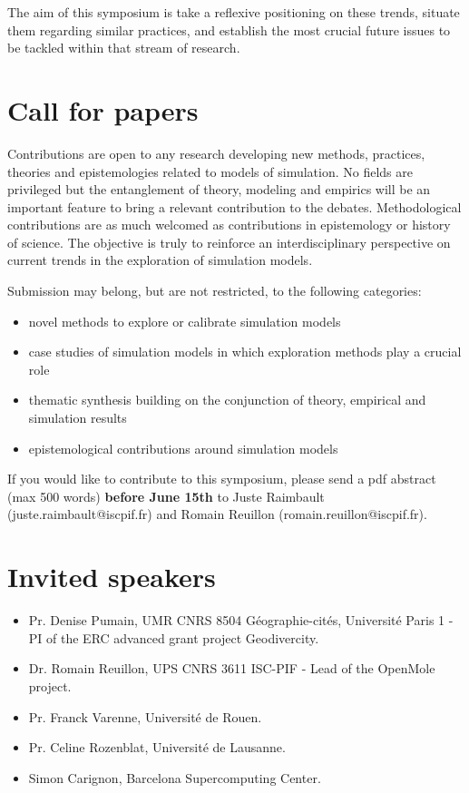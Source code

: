 \documentclass[11pt]{article}
\begin{document}
The aim of this symposium is take a reflexive positioning on these trends, situate them regarding similar practices, and establish the most crucial future issues to be tackled within that stream of research. 

\section*{Call for papers}

Contributions are open to any research developing new methods, practices, theories and epistemologies related to models of simulation. No fields are privileged but the entanglement of theory, modeling and empirics will be an important feature to bring a relevant contribution to the debates. Methodological contributions are as much welcomed as contributions in epistemology or history of science. The objective is truly to reinforce an interdisciplinary perspective on current trends in the exploration of simulation models.

Submission may belong, but are not restricted, to the following categories:
\begin{itemize}
	\item novel methods to explore or calibrate simulation models
	\item case studies of simulation models in which exploration methods play a crucial role
	\item thematic synthesis building on the conjunction of theory, empirical and simulation results
	\item epistemological contributions around simulation models
\end{itemize}
    
    
If you would like to contribute to this symposium, please send a pdf abstract (max 500 words) \textbf{before June 15th} to Juste Raimbault (juste.raimbault@iscpif.fr) and Romain Reuillon (romain.reuillon@iscpif.fr). 
    


\section*{Invited speakers}

\begin{itemize}
    \item Pr. Denise Pumain, UMR CNRS 8504 Géographie-cités, Université Paris 1 - PI of the ERC advanced grant project Geodivercity.
    \item Dr. Romain Reuillon, UPS CNRS 3611 ISC-PIF - Lead of the OpenMole project.
    \item Pr. Franck Varenne, Université de Rouen.
    \item Pr. Celine Rozenblat, Université de Lausanne.
    \item Simon Carignon, Barcelona Supercomputing Center.
\end{itemize}
\end{document}
